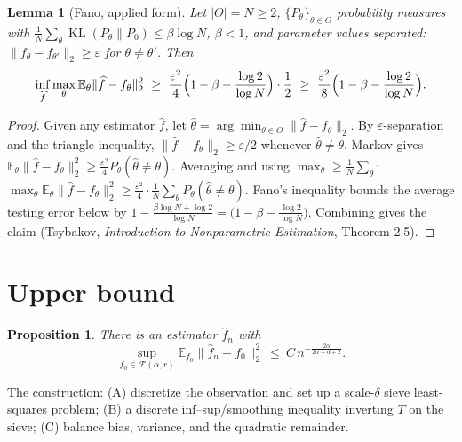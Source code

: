 \documentclass[11pt]{article}
\newtheorem{lemma}[theorem]{Lemma}
\newtheorem{proposition}[theorem]{Proposition}
\theoremstyle{remark}
\newcommand{\E}{\mathbb{E}}
\newcommand{\F}{\mathcal{F}}
\newcommand{\norm}[1]{\lVert #1\rVert}
\newcommand{\abs}[1]{\lvert #1\rvert}
\newcommand{\SET}[1]{\{#1\}}
\begin{document}
\begin{lemma}[Fano, applied form]\label{lem:fano}
Let $\abs{\Theta}=N\ge2$, $\SET{P_\theta}_{\theta\in\Theta}$ probability
measures with $\frac1N\sum_\theta\operatorname{KL}(P_\theta\|P_0)\le\beta\log N$,
$\beta<1$, and parameter values separated:
$\norm{f_\theta-f_{\theta'}}_2\ge\varepsilon$ for $\theta\ne\theta'$. Then
\[
\inf_{\widehat f}\max_{\theta}\E_{\theta}\norm{\widehat f-f_\theta}_2^{2}
\ \ge\ \frac{\varepsilon^{2}}{4}\Bigl(1-\beta-\frac{\log2}{\log N}\Bigr)\cdot\frac1{2}
\ \ge\ \frac{\varepsilon^{2}}{8}\Bigl(1-\beta-\frac{\log2}{\log N}\Bigr).
\]
\end{lemma}
\begin{proof}
Given any estimator $\widehat f$, let
$\widehat\theta=\arg\min_{\theta\in\Theta}\norm{\widehat f-f_\theta}_2$. By
$\varepsilon$-separation and the triangle inequality,
$\norm{\widehat f-f_\theta}_2\ge\varepsilon/2$ whenever
$\widehat\theta\ne\theta$. Markov gives
$\E_\theta\norm{\widehat f-f_\theta}_2^{2}\ge\frac{\varepsilon^{2}}{4}
P_\theta(\widehat\theta\ne\theta)$. Averaging and using
$\max_\theta\ge\frac1N\sum_\theta$:
$\max_\theta\E_\theta\norm{\widehat f-f_\theta}_2^{2}
\ge\frac{\varepsilon^{2}}{4}\cdot\frac1N\sum_\theta
P_\theta(\widehat\theta\ne\theta)$. Fano's inequality bounds the average
testing error below by
$1-\frac{\beta\log N+\log2}{\log N}=\bigl(1-\beta-\frac{\log2}{\log N}\bigr)$.
Combining gives the claim (Tsybakov, \emph{Introduction to Nonparametric
Estimation}, Theorem 2.5).
\end{proof}

\section{Upper bound}\label{sec:upper}

\begin{proposition}\label{prop:upper}
There is an estimator $\widehat f_n$ with
\[
\sup_{f_0\in\F(\alpha,r)}
\E_{f_0}\norm{\widehat f_n-f_0}_{2}^{2}
\ \le\ C\,n^{-\frac{2\alpha}{2\alpha+d+2}} .
\]
\end{proposition}

The construction: (A) discretize the observation and set up a
scale-$\delta$ sieve least-squares problem; (B) a discrete
inf--sup/smoothing inequality inverting $T$ on the sieve; (C) balance
bias, variance, and the quadratic remainder.

\end{document}
